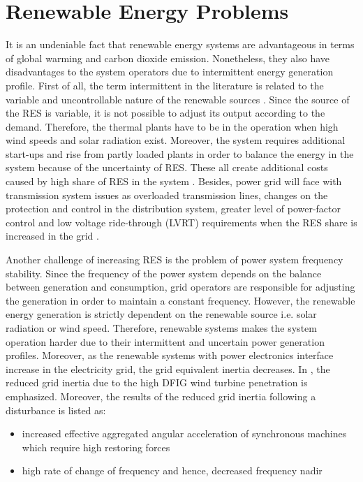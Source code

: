 \section{Renewable Energy Problems}
It is an undeniable fact that renewable energy systems are advantageous in terms of global warming and carbon dioxide emission. Nonetheless, they also have disadvantages to the system operators due to intermittent energy generation profile. First of all, the term intermittent in the literature is related to the variable and uncontrollable nature of the renewable sources \cite{KlingeJacobsen2010}. Since the source of the RES is variable, it is not possible to adjust its output according to the demand. Therefore, the thermal plants have to be in the operation when high wind speeds and solar radiation exist. Moreover, the system requires additional start-ups and rise from partly loaded plants in order to balance the energy in the system because of the uncertainty of RES. These all create additional costs caused by high share of RES in the system \cite{Zipf2013}. Besides, power grid will face with transmission system issues as overloaded transmission lines, changes on the protection and control in the distribution system, greater level of power-factor control and low voltage ride-through (LVRT) requirements when the RES share is increased in the grid \cite{Ipakchi2009}.\par
Another challenge of increasing RES is the problem of power system frequency stability. Since the frequency of the power system depends on the balance between generation and consumption, grid operators are responsible for adjusting the generation in order to maintain a constant frequency. However, the renewable energy generation is strictly dependent on the renewable source i.e. solar radiation or wind speed. Therefore, renewable systems makes the system operation harder due to their intermittent and uncertain power generation profiles. Moreover, as the renewable systems with power electronics interface increase in the electricity grid, the grid equivalent inertia decreases. In \cite{Gautam2011}, the reduced grid inertia due to the high DFIG wind turbine penetration is emphasized. Moreover, the results of the reduced grid inertia following a disturbance is listed as: 
\begin{itemize}
	\item increased effective aggregated angular acceleration of synchronous machines which require high restoring forces
	\item high rate of change of frequency and hence, decreased frequency nadir
\end{itemize}
